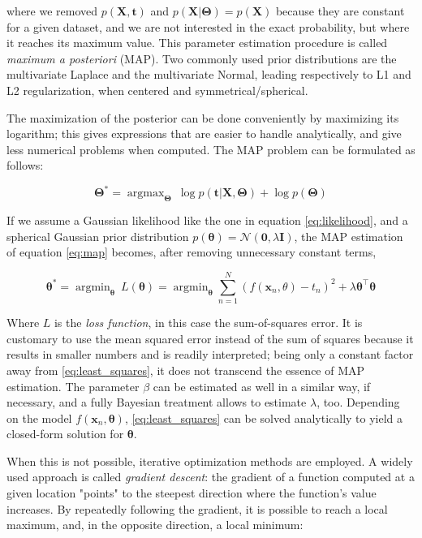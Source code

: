 \documentclass[a4paper]{book}
\DeclareMathOperator*{\argmin}{argmin}
\DeclareMathOperator*{\argmax}{argmax}
\begin{document}
where we removed $p(\bm X,\bm t)$ and $p(\bm X\vert\bm\Theta)=p(\bm X)$ because they are constant for a given dataset, and we are not interested in the exact probability, but where it reaches its maximum value. This parameter estimation procedure is called \emph{maximum a posteriori} (MAP). Two commonly used prior distributions are the multivariate Laplace and the multivariate Normal, leading respectively to L1 and L2 regularization, when centered and symmetrical/spherical.

The maximization of the posterior can be done conveniently by maximizing its logarithm; this gives expressions that are easier to handle analytically, and give less numerical problems when computed. The MAP problem can be formulated as follows:

\begin{equation}
\bm\Theta^*=\argmax_{\bm\Theta}\ \log p(\bm t\vert\bm X,\bm\Theta)+\log p(\bm\Theta)
\end{equation}


If we assume a Gaussian likelihood like the one in equation \ref{eq:likelihood}, and a spherical Gaussian prior distribution $p(\bm\theta)=\mathcal{N}(\bm 0, \lambda\bm I)$, the MAP estimation of equation \ref{eq:map} becomes, after removing unnecessary constant terms,

\begin{equation}
\label{eq:least_squares}
\bm\theta^*=\argmin_{\bm\theta}\ L(\bm\theta)=\argmin_{\bm\theta}\sum_{n=1}^N\left( f(\bm x_n,\theta)-t_n\right)^2+\lambda\bm\theta^\intercal\bm\theta
\end{equation}

Where $L$ is the \emph{loss function}, in this case the sum-of-squares error. It is customary to use the mean squared error instead of the sum of squares because it results in smaller numbers and is readily interpreted; being only a constant factor away from \ref{eq:least_squares}, it does not transcend the essence of MAP estimation. The parameter $\beta$ can be estimated as well in a similar way, if necessary, and a fully Bayesian treatment allows to estimate $\lambda$, too. Depending on the model $f(\bm x_n,\bm\theta)$, \ref{eq:least_squares} can be solved analytically to yield a closed-form solution for $\bm\theta$.
 
When this is not possible, iterative optimization methods are employed. A widely used approach is called \emph{gradient descent}: the gradient of a function computed at a given location "points" to the steepest direction where the function's value increases. By repeatedly following the gradient, it is possible to reach a local maximum, and, in the opposite direction, a local minimum:
\end{document}
